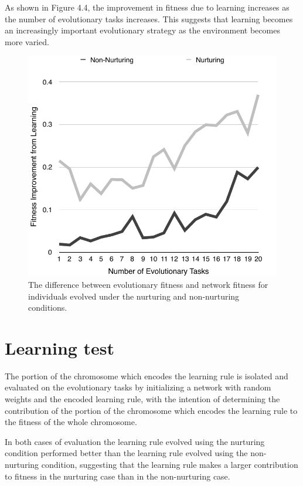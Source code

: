 \documentclass[master]{outhesis}
\begin{document}
As shown in Figure 4.4, the improvement in fitness due to learning increases as the number of evolutionary tasks increases. This suggests that learning becomes an increasingly important evolutionary strategy as the environment becomes more varied.

\begin{figure}[H]
	\centering
	\includegraphics{LearningImprovementPlot.pdf}
	\caption{The difference between evolutionary fitness and network fitness for individuals evolved under the nurturing and non-nurturing conditions.}
\end{figure}

\section{Learning test}

The portion of the chromosome which encodes the learning rule is isolated and evaluated on the evolutionary tasks by initializing a network with random weights and the encoded learning rule, with the intention of determining the contribution of the portion of the chromosome which encodes the learning rule to the fitness of the whole chromosome.

In both cases of evaluation the learning rule evolved using the nurturing condition performed better than the learning rule evolved using the non-nurturing condition, suggesting that the learning rule makes a larger contribution to fitness in the nurturing case than in the non-nurturing case.
\end{document}
